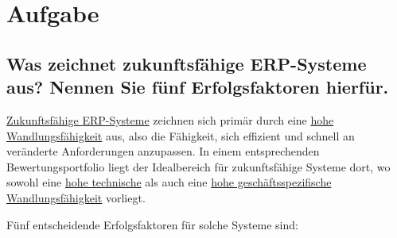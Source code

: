 
\chapter{Aufgabe}
\label{chap:1 Aufgabe}
\thispagestyle{fancy}
\section{Was zeichnet zukunftsfähige ERP-Systeme aus? Nennen Sie fünf Erfolgsfaktoren hierfür.} \par \uline{Zukunftsfähige \acs{ERP}-Systeme} zeichnen sich primär durch eine \uline{hohe Wandlungsfähigkeit} aus, also die Fähigkeit, sich effizient und schnell an veränderte Anforderungen anzupassen. \cite{1}\cite{2} In einem entsprechenden Bewertungsportfolio liegt der Idealbereich für zukunftsfähige Systeme dort, wo sowohl eine \uline{hohe technische} als auch eine \uline{hohe geschäftsspezifische Wandlungsfähigkeit} vorliegt. \cite{3}\cite{4} \par Fünf entscheidende Erfolgsfaktoren für solche Systeme sind:
